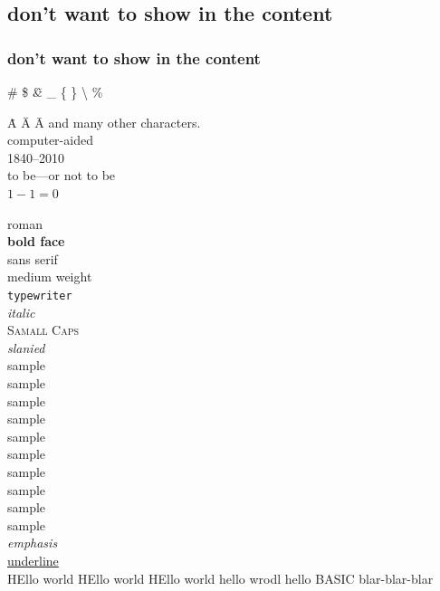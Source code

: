 \documentclass{article}
\begin{document}
\subsection*{don't want to show in the content}
\subsubsection*{don't want to show in the content}


\# 
\$ 
\~ 
\& 
\_ 
\{ 
\} 
\- 
\textbackslash 
\%

\.{A} \"{A} \={A}  and many other characters.\\

computer-aided\\
1840--2010\\
to be---or not to be\\
$1-1=0$

\textrm{roman} \\
\textbf{bold face} \\
\textsf{sans serif} \\
\textmd{medium weight} \\
\texttt{typewriter} \\
\textit{italic} \\
\textsc{Samall Caps} \\
\textsl{slanied}\\

\tiny{sample}\\
\scriptsize{sample}\\
\footnotesize{sample}\\
\small{sample}\\
\normalsize{sample}\\
\large{sample}\\
\Large{sample}\\
\LARGE{sample}\\
\huge{sample}\\
\Huge{sample}\\

\normalsize
\emph{emphasis}\\
\underline{underline}\\

HEllo world HEllo world HEllo world  hello wrodl hello BASIC blar-blar-blar
\end{document}
